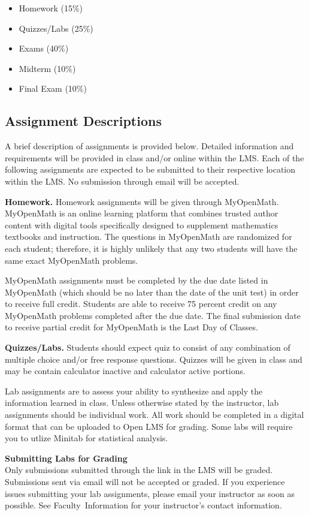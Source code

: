 \documentclass{article}
\renewenvironment{framed}[1][]{%
  \def\FrameCommand{%
    \hspace{1pt}%
    {\color{mybordercolor}\vrule width 2pt} %
    \hspace{1pt}%
    \fboxsep=\FrameSep%
    \colorbox{mybgcolor}%
  }%
  \MakeFramed {\advance\hsize-\width \FrameRestore}%
}{%
  \endMakeFramed
}
\begin{document}
\begin{itemize}
\item Homework (15\%)
\item Quizzes/Labs (25\%)
\item Exams (40\%)
\item Midterm (10\%)
\item Final Exam (10\%)
\end{itemize}

\subsection{Assignment Descriptions}

A brief description of assignments is provided below. Detailed information and requirements will be provided in class and/or online within the LMS. Each of the following assignments are expected to be submitted to their respective location within the LMS. No submission through email will be accepted.

\textbf{Homework.} Homework assignments will be given through MyOpenMath. MyOpenMath is an online learning platform that combines trusted author content with digital tools specifically designed to supplement mathematics textbooks and instruction. The questions in MyOpenMath are randomized for each student; therefore, it is highly unlikely that any two students will have the same exact MyOpenMath problems.

MyOpenMath assignments must be completed by the due date listed in MyOpenMath (which should be no later than the date of the unit test) in order to receive full credit. Students are able to receive 75 percent credit on any MyOpenMath problems completed after the due date. The final submission date to receive partial credit for MyOpenMath is the Last Day of Classes.

\textbf{Quizzes/Labs.} Students should expect quiz to consist of any combination of multiple choice and/or free response questions. Quizzes will be given in class and may be contain calculator inactive and calculator active portions.

Lab assignments are to assess your ability to synthesize and apply the information learned in class. Unless otherwise stated by the instructor, lab assignments should be individual work. All work should be completed in a digital format that can be uploaded to Open LMS for grading. Some labs will require you to utlize Minitab for statistical analysis.

\begin{framed}
\textbf{Submitting Labs for Grading}\\
Only submissions submitted through the link in the LMS will be graded. Submissions sent via email will not be accepted or graded. If you experience issues submitting your lab assignments, please email your instructor as soon as possible. See Faculty~Information for your instructor's contact information.
\end{framed}
\end{document}
